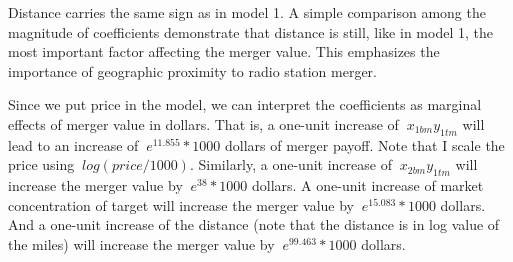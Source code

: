 \documentclass[letterpaper,12pt]{article}
\theoremstyle{definition}
\begin{document}
Distance carries the same sign as in model 1. A simple comparison among the magnitude of coefficients demonstrate that distance is still, like in model 1, the most important factor affecting the merger value. This emphasizes the importance of geographic proximity to radio station merger.

Since we put price in the model, we can interpret the coefficients as marginal effects of merger value in dollars. That is, a one-unit increase of $\ x_{1bm}y_{1tm} $ will lead to an increase of $\ e^{11.855} * 1000 $ dollars of merger payoff. Note that I scale the price using $\ log (price/1000) $. Similarly, a one-unit increase of $\ x_{2bm}y_{1tm} $ will increase the merger value by $\ e^{38} * 1000 $ dollars. A one-unit increase of market concentration of target will increase the merger value by $\ e^{15.083} * 1000 $ dollars. And a one-unit increase of the distance (note that the distance is in log value of the miles) will increase the merger value by $\ e^{99.463} * 1000 $ dollars.

 
\end{document}
